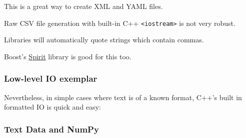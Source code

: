 This is a great way to create XML and YAML files.

Raw CSV file generation with built-in C++
\texttt{\textless{}iostream\textgreater{}} is not very robust.

Libraries will automatically quote strings which contain commas.

Boost's \href{http://boost-spirit.com/home/}{Spirit} library is good for
this too.

\subsubsection{Low-level IO exemplar}\label{low-level-io-exemplar}

Nevertheless, in simple cases where text is of a known format, C++'s
built in formatted IO is quick and easy:

\begin{Shaded}
\begin{Highlighting}[]

  
     
\NormalTok{\}}
\end{Highlighting}
\end{Shaded}

\begin{Shaded}
\begin{Highlighting}[]

 
  \NormalTok{(} 
    \NormalTok{(} 
      \NormalTok{;}
    \NormalTok{\}}
  \NormalTok{\}}
\NormalTok{\}}
\end{Highlighting}
\end{Shaded}

\subsubsection{Text Data and NumPy}\label{text-data-and-numpy}

